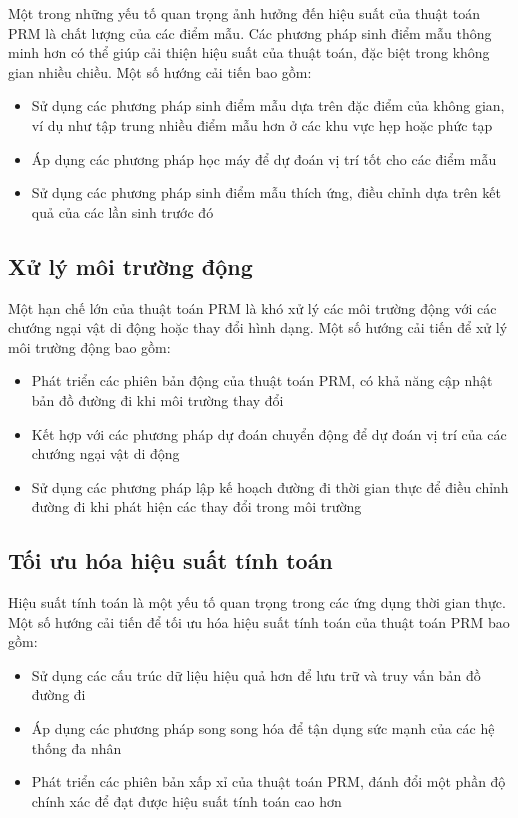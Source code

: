 \documentclass[12pt,a4paper,openany,oneside]{report}
\begin{document}
Một trong những yếu tố quan trọng ảnh hưởng đến hiệu suất của thuật toán PRM là chất lượng của các điểm mẫu. Các phương pháp sinh điểm mẫu thông minh hơn có thể giúp cải thiện hiệu suất của thuật toán, đặc biệt trong không gian nhiều chiều. Một số hướng cải tiến bao gồm:

\begin{itemize}
    \item Sử dụng các phương pháp sinh điểm mẫu dựa trên đặc điểm của không gian, ví dụ như tập trung nhiều điểm mẫu hơn ở các khu vực hẹp hoặc phức tạp
    \item Áp dụng các phương pháp học máy để dự đoán vị trí tốt cho các điểm mẫu
    \item Sử dụng các phương pháp sinh điểm mẫu thích ứng, điều chỉnh dựa trên kết quả của các lần sinh trước đó
\end{itemize}

\subsection{Xử lý môi trường động}

Một hạn chế lớn của thuật toán PRM là khó xử lý các môi trường động với các chướng ngại vật di động hoặc thay đổi hình dạng. Một số hướng cải tiến để xử lý môi trường động bao gồm:

\begin{itemize}
    \item Phát triển các phiên bản động của thuật toán PRM, có khả năng cập nhật bản đồ đường đi khi môi trường thay đổi
    \item Kết hợp với các phương pháp dự đoán chuyển động để dự đoán vị trí của các chướng ngại vật di động
    \item Sử dụng các phương pháp lập kế hoạch đường đi thời gian thực để điều chỉnh đường đi khi phát hiện các thay đổi trong môi trường
\end{itemize}

\subsection{Tối ưu hóa hiệu suất tính toán}

Hiệu suất tính toán là một yếu tố quan trọng trong các ứng dụng thời gian thực. Một số hướng cải tiến để tối ưu hóa hiệu suất tính toán của thuật toán PRM bao gồm:

\begin{itemize}
    \item Sử dụng các cấu trúc dữ liệu hiệu quả hơn để lưu trữ và truy vấn bản đồ đường đi
    \item Áp dụng các phương pháp song song hóa để tận dụng sức mạnh của các hệ thống đa nhân
    \item Phát triển các phiên bản xấp xỉ của thuật toán PRM, đánh đổi một phần độ chính xác để đạt được hiệu suất tính toán cao hơn
\end{itemize}
\end{document}
